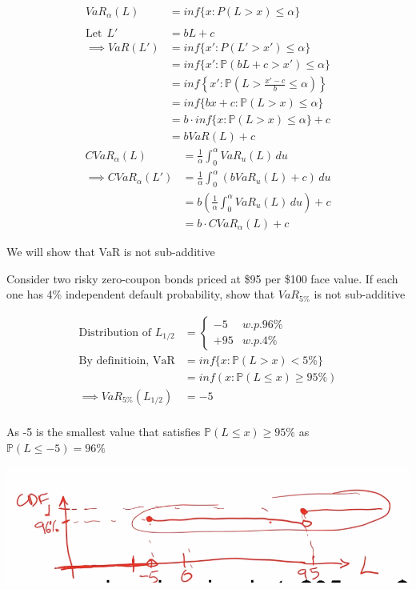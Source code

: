 \documentclass[
  oneside]{book}
\begin{document}
\[
\begin{aligned}
VaR_{\alpha}(L) &= inf\{x:P(L>x) \leq \alpha\}\\
\\
\text{Let}\ \ L' &= bL+c\\
\implies VaR(L') &= inf\{x': P(L' >x') \leq \alpha\}\\
&= inf\{x':\mathbb{P}(bL+c > x') \leq \alpha\}\\
&= inf\left\{ x': \mathbb{P}\left( L> \frac{x'-c}{b} \leq \alpha \right) \right\}\\
&= inf\{bx+c : \mathbb{P}(L > x) \leq \alpha\}\\
&=b\cdot inf\{x: \mathbb{P}(L > x) \leq \alpha\}+c\\
&= b VaR(L)+c
\end{aligned}
\]
\[
\begin{aligned}
CVaR_{\alpha}(L) &= \frac{1}{\alpha}\int ^{\alpha}_{0} VaR_{u}(L) \, du\\
\implies CVaR_{\alpha}(L') &= \frac{1}{\alpha}\int ^{\alpha}_{0}(bVaR_{u}(L)+c) \, du\\
&= b\left( \frac{1}{\alpha} \int ^{\alpha}_{0}VaR_{u}(L) \, du\right) +c\\
&= b \cdot CVaR_{\alpha}(L)+c
\end{aligned}
\]

We will show that VaR is not sub-additive

Consider two risky zero-coupon bonds priced at \$95 per \$100 face value. If each one has 4\% independent default probability, show that \(VaR_{5\%}\) is not sub-additive

\[
\begin{aligned}
\text{Distribution of }L_{1/2} &= \begin{cases}
-5 & w.p. 96\% \\
+95  & w.p. 4\%
\end{cases}\\
\text{By definitioin, VaR} & = inf\{x: \mathbb{P}(L >x)<5\%\}\\
&= inf(x: \mathbb{P}(L \leq x)\geq 95\%)\\
\implies VaR_{5\%}(L_{1/2}) &= -5 \\
\end{aligned}
\]

As -5 is the smallest value that satisfies \(\mathbb{P}(L\leq x) \geq 95\%\) as \(\mathbb{P}(L \leq -5) = 96\%\)

\includegraphics{Notes/Obsidian-Attachments/7-Risk-Management-4.png}
\end{document}
